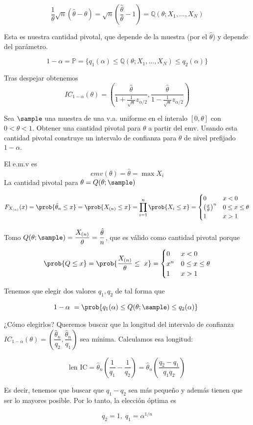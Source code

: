\begin{problem}[5]
\[
\frac{1}{\theta} \sqrt{n}(\hat{\theta} - \theta)  = 
\sqrt{n} \left(\frac{\hat{\theta}}{\theta} - 1 \right) = \mathbb{Q}(\theta;X_1,...,X_N)
\]

Esta es nuestra cantidad pivotal, que depende de la muestra (por el $\hat{\theta}$) y depende del parámetro.

\[1-\alpha  = \mathbb{P} = \{q_1(\alpha) \leq \mathbb{Q}(\theta;X_1,...,X_N) \leq q_2 (\alpha)\}\]

Tras despejar obtenemos
\[
IC_{1-\alpha}(\theta) =
(\frac{\hat\theta}{1 + \frac{1}{\sqrt{n}} z_{\alpha/2}}, \frac{\hat\theta}{1 - \frac{1}{\sqrt{n}} z_{\alpha/2}})
\]
\end{problem}

\begin{problem}[6]
Sea $\sample$ una muestra de una v.a. uniforme en el interalo $[0,\theta]$ con $0 < \theta < 1$. Obtener una cantidad pivotal para $\theta$ a partir del emv. Usando esta cantidad pivotal construye un intervalo de confianza para $\theta$ de nivel prefijado $1-\alpha$.

\solution

El e.m.v es \[ emv (\theta) = \hat{\theta} = \max X_i \] La cantidad pivotal para $\theta = Q(\theta; \sample)$

\[ F_{X_{(n)}} (x) = \prob{\hat{\theta}_n \leq x} = \prob{X_{(n)} \leq x} = \prod_{i=1}^{n} \prob{X_i \leq x} = \begin{cases}
0& x<0 \\
\left( \frac{x}{\theta} \right)^n & 0\leq x \leq \theta \\
1 & x > 1
\end{cases}\]

Tomo $Q(\theta; \sample ) = \dfrac{X_{(n)}}{\theta} = \dfrac{\hat{\theta}}{n}$, que es válido como cantidad pivotal porque \[ \prob{Q \leq x} = \prob{\frac{X_{(n)}}{\theta} \leq x} = \begin{cases}
0 & x<0 \\
x^n & 0\leq x \leq \theta \\
1 & x > 1
\end{cases} \]

Tenemos que elegir dos valores $q_1, q_2$ de tal forma que 

\[ 1- \alpha = \prob{q_1(\alpha) \leq Q(\theta;\sample) \leq q_2(\alpha)} \]

¿Cómo elegirlos? Queremos buscar que la longitud del intervalo de confianza $IC_{1-\alpha}(\theta) = \left(\dfrac{\hat{\theta}_n}{q_2},\dfrac{\hat{\theta}_n}{q_1}\right)$ sea mínima. Calculamos esa longitud:

\[ \text{len IC} = \hat{\theta}_n\left(\frac{1}{q_1}-\frac{1}{q_2}\right)=\hat{\theta}_n \left(\frac{q_2-q_1}{q_1q_2}\right) \]

Es decir, tenemos que buscar que $q_1-q_2$ sea más pequeño y además tienen que ser lo mayores posible. Por lo tanto, la elección óptima es 

\[ q_2 = 1,\;q_1=\alpha^{1/n} \]

\end{problem}


